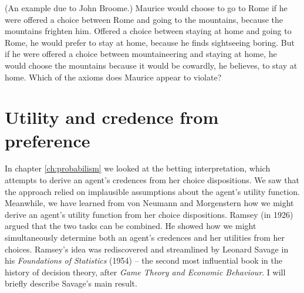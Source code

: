 
\begin{exercise1}
  (An example due to John Broome.) Maurice would choose to go to Rome
  if he were offered a choice between Rome and going to the mountains,
  because the mountains frighten him. Offered a choice between staying
  at home and going to Rome, he would prefer to stay at home, because
  he finds sightseeing boring. But if he were offered a choice between
  mountaineering and staying at home, he would choose the mountains
  because it would be cowardly, he believes, to stay at home. Which of
  the axioms does Maurice appear to violate?
\end{exercise1}


\section{Utility and credence from preference}

In chapter \ref{ch:probabilism} we looked at the betting
interpretation, which attempts to derive an agent's credences from her
choice dispositions. We saw that the approach relied on implausible
assumptions about the agent's utility function. Meanwhile, we
have learned from von Neumann and Morgenstern how we might derive an
agent's utility function from her choice dispositions. Ramsey (in
1926) argued that the two tasks can be combined. He showed how we
might simultaneously determine both an agent's credences and her
utilities from her choices.%
%
%
Ramsey's idea was rediscovered and streamlined by Leonard Savage in
his \emph{Foundations of Statistics} (1954) -- the second most
influential book in the history of decision theory, after \emph{Game
  Theory and Economic Behaviour}. I will briefly describe Savage's
main result.


